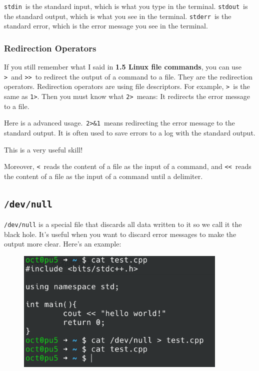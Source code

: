\documentclass[12pt]{ctexart}
\newenvironment{mdquote}
{%
  \par\noindent
  \begin{list}{}{%
      \setlength{\leftmargin}{1em}%
      \setlength{\rightmargin}{0pt}%
      \setlength{\itemindent}{0pt}%
      \setlength{\listparindent}{\parindent}%
      \setlength{\topsep}{0.5\baselineskip}%
  }
  \item[\textbf{>}\ ]\itshape
}
{\end{list}\par}
\begin{document}
\texttt{stdin}\ is the standard input, which is what you type in the terminal.
\texttt{stdout}\ is the standard output, which is what you see in the terminal.
\texttt{stderr}\ is the standard error, which is the error message you see in the terminal.

\subsubsection*{\textbf{Redirection Operators}}

If you still remember what I said in \textbf{1.5 Linux file commands},
you can use \texttt{>}\ and \texttt{>>}\ to redirect the output of a command to a file.
They are the redirection operators. Redirection operators are using file descriptors.
For example, \texttt{>}\ is the same as \texttt{1>}. Then you must know what \texttt{2>}\ means:
It redirects the error message to a file.

Here is a advanced usage.\ \texttt{2\textgreater{}\&1}\ means redirecting the error message
to the standard output. It is often used to save errors to a log with the standard output.

\begin{mdquote}
This is a very useful skill!
\end{mdquote}

Moreover, \texttt{<}\ reads the content of a file as the input of a command,
and \texttt{<<}\ reads the content of a file as the input of a command until a delimiter.

\subsection*{\texttt{/dev/null}}

\texttt{/dev/null} is a special file that discards all data written to it so we
call it the black hole. It's useful when you want to discard error messages to
make the output more clear. Here's an example:

\begin{figure}
    \centering
    \includegraphics[width=0.9\textwidth,keepaspectratio]{assets/Linux/1.8 Some trivial contents on Linux/4.png}
\end{figure}
\end{document}
